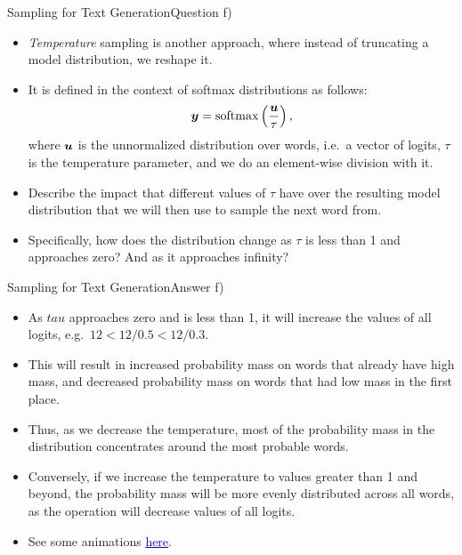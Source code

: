 \documentclass[t]{beamer}
\begin{document}
\begin{frame}{Sampling for Text Generation}{Question f)}
    \begin{itemize}
        \item \emph{Temperature} sampling is another approach, where instead of
              truncating a model distribution, we reshape it.
        \item It is defined in the context of softmax distributions as follows:
              \begin{align*}
                  {\boldsymbol{y}} = \operatorname{softmax}\left(\frac{{\boldsymbol{u}}}{\tau}\right),
              \end{align*}
              where ${\boldsymbol{u}}$ is the unnormalized distribution over words, i.e.\
              a vector of logits, $\tau$ is the temperature parameter, and we do
              an element-wise division with it.
        \item Describe the impact that different values of $\tau$ have over the
              resulting model distribution that we will then use to sample the
              next word from.
        \item Specifically, how does the distribution change as $\tau$ is less
              than 1 and approaches zero? And as it approaches infinity?
    \end{itemize}
\end{frame}

\begin{frame}{Sampling for Text Generation}{Answer f)}
    \begin{itemize}
        \item As $tau$ approaches zero and is less than 1, it will increase the
              values of all logits, e.g.\ $12 < 12/0.5 < 12/0.3$.
        \item This will result in increased probability mass on words that
              already have high mass, and decreased probability mass on words
              that had low mass in the first place.
        \item Thus, as we decrease the temperature, most of the probability mass
              in the distribution concentrates around the most probable words.
        \item Conversely, if we increase the temperature to values greater than
              1 and beyond, the probability mass will be more evenly distributed
              across all words, as the operation will decrease values of all
              logits.
        \item See some animations
              \href{https://medium.com/@harshit158/softmax-temperature-5492e4007f71}{\textcolor{blue}{\underline{here}}}.
    \end{itemize}
\end{frame}
\end{document}
